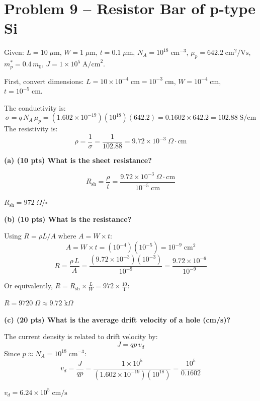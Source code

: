 \documentclass[11pt]{article}
\begin{document}
\section*{Problem 9 -- Resistor Bar of p-type Si}

Given: $L = 10\;\mu\text{m}$, $W = 1\;\mu\text{m}$, $t = 0.1\;\mu\text{m}$, $N_A = 10^{18}\;\text{cm}^{-3}$, $\mu_p = 642.2\;\text{cm}^2/\text{Vs}$, $m_p^* = 0.4\,m_0$, $J = 1 \times 10^5\;\text{A/cm}^2$.

First, convert dimensions: $L = 10 \times 10^{-4}\;\text{cm} = 10^{-3}\;\text{cm}$, $W = 10^{-4}\;\text{cm}$, $t = 10^{-5}\;\text{cm}$.

The conductivity is:
\[
  \sigma = q \, N_A \, \mu_p = (1.602 \times 10^{-19})(10^{18})(642.2) = 0.1602 \times 642.2 = 102.88\;\text{S/cm}
\]
The resistivity is:
\[
  \rho = \frac{1}{\sigma} = \frac{1}{102.88} = 9.72 \times 10^{-3}\;\Omega\!\cdot\!\text{cm}
\]

\textbf{(a) (10 pts) What is the sheet resistance?}

\[
  R_{\text{sh}} = \frac{\rho}{t}
  = \frac{9.72 \times 10^{-3}\;\Omega\!\cdot\!\text{cm}}{10^{-5}\;\text{cm}}
\]

\begin{answerbox}
  $R_{\text{sh}} = 972\;\Omega/\square$
\end{answerbox}

\textbf{(b) (10 pts) What is the resistance?}

Using $R = \rho L / A$ where $A = W \times t$:
\[
  A = W \times t = (10^{-4})(10^{-5}) = 10^{-9}\;\text{cm}^2
\]
\[
  R = \frac{\rho \, L}{A}
  = \frac{(9.72 \times 10^{-3})(10^{-3})}{10^{-9}}
  = \frac{9.72 \times 10^{-6}}{10^{-9}}
\]

Or equivalently, $R = R_{\text{sh}} \times \frac{L}{W} = 972 \times \frac{10}{1}$:

\begin{answerbox}
  $R = 9720\;\Omega \approx 9.72\;\text{k}\Omega$
\end{answerbox}

\textbf{(c) (20 pts) What is the average drift velocity of a hole (cm/s)?}

The current density is related to drift velocity by:
\[
  J = qp\,v_d
\]
Since $p \approx N_A = 10^{18}\;\text{cm}^{-3}$:
\[
  v_d = \frac{J}{qp} = \frac{1 \times 10^5}{(1.602 \times 10^{-19})(10^{18})}
  = \frac{10^5}{0.1602}
\]

\begin{answerbox}
  $v_d = 6.24 \times 10^{5}\;\text{cm/s}$
\end{answerbox}
\end{document}
